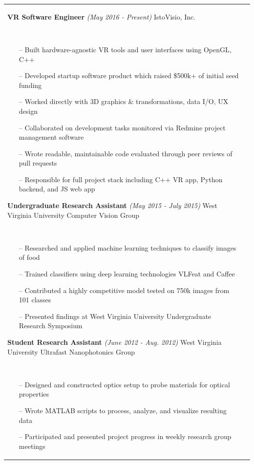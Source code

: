 \documentclass{article}
\begin{document}
\begin{tabular}{@{}p{2.5cm}@{\hspace{0.2cm}}p{13cm}@{}}
\textbf{VR Software Engineer}
\hfill\small\textit{(May 2016 - Present)}\normalsize
\newline IstoVisio, Inc.
\par\,\small
\begin{itemize}[leftmargin=*,nolistsep,noitemsep]
  \item[--]Built hardware-agnostic VR tools and user interfaces using OpenGL, C++
  \item[--]Developed startup software product which raised \$500k+ of initial seed funding
	\item[--]Worked directly with 3D graphics \& transformations, data I/O, UX design
	\item[--]Collaborated on development tasks monitored via Redmine project management software
	\item[--]Wrote readable, maintainable code evaluated through peer reviews of pull requests
	\item[--]Responsible for full project stack including C++ VR app, Python backend, and JS web app
\newline
\end{itemize}
\normalsize

\textbf{Undergraduate Research Assistant}
\hfill\small\textit{(May 2015 - July 2015)}\normalsize
\newline West Virginia University Computer Vision Group
\par\,\small
\begin{itemize}[leftmargin=*,nolistsep,noitemsep]
  \item[--]Researched and applied machine learning techniques to classify images of food
  \item[--]Trained classifiers using deep learning technologies VLFeat and Caffee
  \item[--]Contributed a highly competitive model tested on 750k images from 101 classes
	\item[--]Presented findings at West Virginia University Undergraduate Research Symposium
\newline
\end{itemize}
\normalsize

\textbf{Student Research Assistant}
\hfill\small\textit{(June 2012 - Aug. 2012)}\normalsize
\newline West Virginia University Ultrafast Nanophotonics Group
\par\,\small
\begin{itemize}[leftmargin=*, nolistsep,noitemsep]
  \item[--]Designed and constructed optics setup to probe materials for optical properties
  \item[--]Wrote MATLAB scripts to process, analyze, and visualize resulting data
	\item[--]Participated and presented project progress in weekly research group meetings
\end{itemize}
\normalsize \\


\end{tabular}
\end{document}
